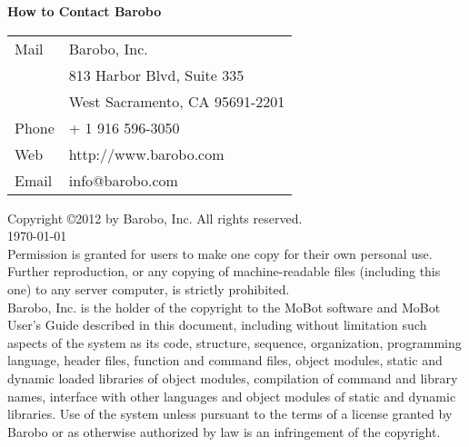 \newpage
\noindent
{\large\bf How to Contact Barobo}\\
\vspace*{-6pt}

\begin{tabular} {ll}
Mail & Barobo, Inc. \\
      &813 Harbor Blvd, Suite 335\\
      &West Sacramento, CA 95691-2201\\
Phone & + 1 916 596-3050\\
Web &http://www.barobo.com\\
Email &info@barobo.com 
\end{tabular}

\vspace{12pt}
\noindent
Copyright \copyright 2012 by Barobo, Inc.
All rights reserved. \\
\today\\

\noindent
Permission is granted for users to make
one copy for their own personal use. Further reproduction,
or any copying of machine-readable files (including this one)
to any server computer, is strictly prohibited.\\


\noindent
Barobo, Inc. 
is the holder of the copyright to the MoBot software
and MoBot User's Guide
described in this document, including without limitation
such aspects of the system as its code, structure,
sequence, organization, 
programming language, 
header files, 
function and command files,
object modules,
static and dynamic loaded libraries 
of object modules,
compilation of command and library names, 
interface with other languages and object modules
of static and dynamic libraries.
Use of the system unless pursuant to the terms
of a license granted by Barobo or as
otherwise authorized by law is an infringement
of the copyright.\\

